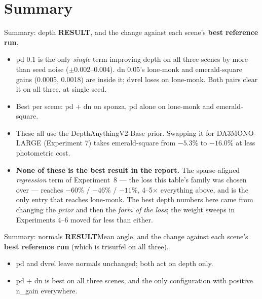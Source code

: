 \documentclass[aspectratio=169,9pt]{beamer}
\makeatletter
\newcommand{\up}[1]{\textcolor{good}{#1}}
\newcommand{\code}[1]{{\ttfamily\fontsize{0.92\f@size}{\f@baselineskip}\selectfont #1}}
\newcommand{\lbl}[1]{\textcolor{lblcol}{\scriptsize\bfseries #1}\hspace{0.5em}}
\newcommand{\res}{\lbl{RESULT}}
\makeatother
\begin{document}
\section{Summary}

\begin{frame}{Summary: depth}
  \res \code{abs\_rel}, and the change against each scene's \textbf{best reference run}.
  \begin{center}\scriptsize
    
  \end{center}
  \vspace{0.5em}
  \begin{itemize}\small
    \item \code{pd 0.1} is the only \emph{single} term improving depth on all three scenes by
          more than seed noise ($\pm$0.002--0.004). \code{dn 0.05}'s \code{lone-monk} and
          \code{emerald-square} gains (0.0005, 0.0018) are inside it; \code{dvrel} loses on
          \code{lone-monk}. Both pairs clear it on all three, at single seed.
    \item Best per scene: \code{pd + dn} on \code{sponza}, \code{pd} alone on \code{lone-monk}
          and \code{emerald-square}.
    \item These all use the \code{DepthAnythingV2-Base} prior. Swapping it for
          \code{DA3MONO-LARGE} (Experiment 7) takes \code{emerald-square} from $-5.3\%$ to
          $-16.0\%$ at less photometric cost.
    \item \textbf{None of these is the best result in the report.} The sparse-aligned
          \emph{regression} term of Experiment~8 --- the loss this table's family was chosen over
          --- reaches \up{$-60\%$ / $-46\%$ / $-11\%$}, 4--5$\times$ everything above, and is the
          only entry that reaches \code{lone-monk}. The best depth numbers here came from
          changing the \emph{prior} and then the \emph{form of the loss}; the weight sweeps in
          Experiments 4--6 moved far less than either.
  \end{itemize}
\end{frame}

\begin{frame}{Summary: normals}
  \res Mean angle, and the change against each scene's \textbf{best reference run} (which is
  \code{trisurfel} on all three).
  \begin{center}\scriptsize
    
  \end{center}
  \vspace{0.5em}
  \begin{itemize}\small
    \item \code{pd} and \code{dvrel} leave normals unchanged; both act on depth only.
    \item \code{pd + dn} is best on all three scenes, and the only configuration with positive
          \code{n\_gain} everywhere.
  \end{itemize}
\end{frame}
\end{document}
